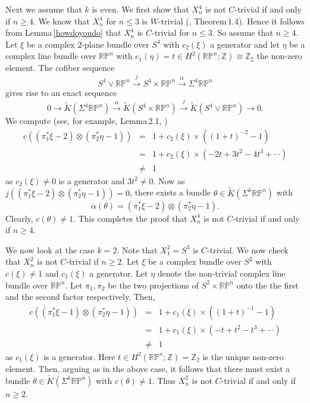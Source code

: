 \documentclass[12pt,reqno]{amsart}
\numberwithin{equation}{subsection}
\theoremstyle{definition}
\begin{document}
Next we assume that $k$ is even. We first show that $X^4_n$ is not $C$-trivial if and only if  $n\geq 4$.
We know that $X^4_n$ for $n \leq 3$ is $W$-trivial (\cite{tanaka}, Theorem\,1.4). 
Hence it follows from Lemma\,\ref{howdoyoudo} that $X^4_n$ is $C$-trivial for $n \leq 3$. So assume that $n\geq 4$. Let $\xi$ be a complex $2$-plane bundle over $S^4$ with $c_2(\xi)$ a generator and let $\eta$ be a complex line bundle over $\mathbb R\mathbb P^n$ with 
$c_1(\eta)=t\in H^2(\mathbb R\mathbb P^n;\mathbb Z)\cong \mathbb Z_2$ the non-zero element. 
The cofiber sequence 
$$S^4\vee \mathbb R\mathbb P^n\stackrel{j}\longrightarrow S^4\times \mathbb R\mathbb P^n\stackrel{\alpha}\longrightarrow\Sigma^4\mathbb R\mathbb P^n$$
gives rise to an exact sequence 
$$0\rightarrow \widetilde{K}(\Sigma^4\mathbb R\mathbb P^n)\stackrel{\alpha}\longrightarrow\widetilde{K}(S^4\times\mathbb R\mathbb P^n)
\stackrel{j}\longrightarrow\widetilde{K}(S^4\vee \mathbb R\mathbb P^n)\rightarrow 0.$$
We compute (see, for example, Lemma\,2.1, \cite{tanaka})
$$\begin{array}{rcl}
c((\pi_1^*\xi-2)\otimes (\pi_2^*\eta-1)) & = & 1+ c_2(\xi)\times ((1+t)^{-2}-1)\\
& = & 1+ c_2(\xi)\times (-2t+3t^2-4t^3+\cdots)\\
& \neq & 1
\end{array}$$
as $c_2(\xi)\neq 0$ is a generator and $3t^2\neq 0$. 
Now as $j((\pi_1^*\xi-2)\otimes (\pi_2^*\eta-1))=0$, there exists a bundle $\theta\in \widetilde{K}(\Sigma^k\mathbb R\mathbb P^n)$ with 
$$\alpha(\theta)=(\pi_1^*\xi-2)\otimes (\pi_2^*\eta-1).$$ 
Clearly, $c(\theta)\neq 1$. This completes the proof that $X^4_n$ is not $C$-trivial if and only if $n\geq 4$. 

We now look at the case $k = 2$. Note that $X^2_1=S^3$ is $C$-trivial. We now check that $X^2_n$ is not $C$-trivial if $n \geq 2$. 
Let $\xi$ be a complex bundle over $S^{2}$ with $c(\xi)\neq 1$ and $c_1(\xi)$ a generator. Let $\eta$ denote the non-trivial complex line bundle over $\mathbb R\mathbb P^n$. Let $\pi_1,\pi_2$ be the two projections of $S^{2}\times\mathbb R\mathbb P^n$ onto the the first and the second factor respectively. Then, 
$$\begin{array}{rcl}
c((\pi_1^*\xi-1)\otimes (\pi_2^*\eta-1)) & = & 1+ c_1(\xi)\times ((1+t)^{-1}-1)\\
& = & 1+ c_1(\xi)\times (-t+t^2-t^3+\cdots)\\
& \neq & 1
\end{array}$$
as $c_1(\xi)$ is a generator. 
Here $t\in H^2(\mathbb R\mathbb P^n;\mathbb Z)=\mathbb Z_2$ is the unique non-zero element. Then, arguing as in the above case, it follows that 
there must exist a bundle $\theta\in \widetilde{K}(\Sigma^k\mathbb R\mathbb P^n)$ with $c(\theta)\neq 1$. Thus $X^2_n$ is not $C$-trivial if and only if  $n\geq 2$. 
 
\end{document}
